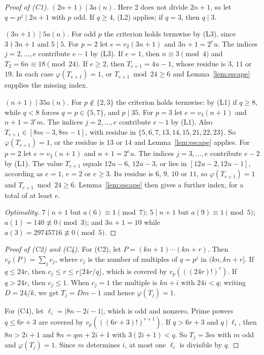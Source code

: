 \documentclass[11pt]{amsart}
\theoremstyle{remark}
\begin{document}
\begin{proof}[Proof of (C1)]
\emph{$(2n+1)\mid3a(n)$.}
Here 2 does not divide $2n+1$, so let $q=p^j\mid2n+1$ with $p$ odd.
If $q\ge4$, (L2) applies; if $q=3$, then $q\mid3$.

\emph{$(3n+1)\mid5a(n)$.}
For odd $p$ the criterion holds termwise by (L3), since $3\nmid3n+1$ and $5\mid5$.
For $p=2$ let $e=v_2(3n+1)$ and $3n+1=2^eu$.
The indices $j=2,\dots,e$ contribute $e-1$ by (L3).
If $e=1$, then $n\equiv3\pmod4$ and $T_2=6n\equiv18\pmod{24}$.
If $e\ge2$, then $T_{e+1}=4u-1$, whose residue is $3$, $11$ or $19$.
In each case $\varphi(T_{e+1})=1$, or $T_{e+1}\bmod24\ge6$ and Lemma~\ref{lem:escape} supplies the missing index.

\emph{$(n+1)\mid35a(n)$.}
For $p\notin\{2,3\}$ the criterion holds termwise: by (L1) if $q\ge8$, while $q<8$ forces $q=p\in\{5,7\}$, and $p\mid35$.
For $p=3$ let $e=v_3(n+1)$ and $n+1=3^em$.
The indices $j=2,\dots,e$ contribute $e-1$ by (L1).
Also $T_{e+1}\in[8m-3,8m-1]$, with residue in $\{5,6,7,13,14,15,21,22,23\}$.
So $\varphi(T_{e+1})=1$, or the residue is $13$ or $14$ and Lemma~\ref{lem:escape} applies.
For $p=2$ let $e=v_2(n+1)$ and $n+1=2^eu$.
The indices $j=3,\dots,e$ contribute $e-2$ by (L1).
The value $T_{e+1}$ equals $12u-6$, $12u-3$, or lies in $[12u-2,12u-1]$, according as $e=1$, $e=2$ or $e\ge3$.
Its residue is $6$, $9$, $10$ or $11$, so $\varphi(T_{e+1})=1$ and $T_{e+1}\bmod24\ge6$.
Lemma~\ref{lem:escape} then gives a further index, for a total of at least $e$.

\emph{Optimality.}
$7\mid n+1$ but $a(6)\equiv1\pmod7$; $5\mid n+1$ but $a(9)\equiv1\pmod5$; $a(1)=140\not\equiv0\pmod3$; and $3n+1=10$ while $a(3)=29745716\not\equiv0\pmod5$.
\end{proof}

\begin{proof}[Proof of (C2) and (C4)]
For (C2), let $P=(kn+1)\cdots(kn+r)$.
Then $v_p(P)=\sum_jc_j$, where $c_j$ is the number of multiples of $q=p^j$ in $(kn,kn+r]$.
If $q\le24r$, then $c_j\le r\le r\lfloor24r/q\rfloor$, which is covered by $v_p(((24r)!)^r)$.
If $q>24r$, then $c_j\le1$.
When $c_j=1$ the multiple is $kn+i$ with $24i<q$; writing $D=24/k$, we get $T_j=Dm-1$ and hence $\varphi(T_j)=1$.

For (C4), let $\ell_i=|8n-2i-1|$, which is odd and nonzero.
Prime powers $q\le6r+3$ are covered by $v_p(((6r+3)!)^{r+1})$.
If $q>6r+3$ and $q\mid\ell_i$, then $8n>2i+1$ and $8n=qm+2i+1$ with $3(2i+1)<q$.
So $T_j=3m$ with $m$ odd and $\varphi(T_j)=1$.
Since $m$ determines $i$, at most one $\ell_i$ is divisible by $q$.
\end{proof}
\end{document}
